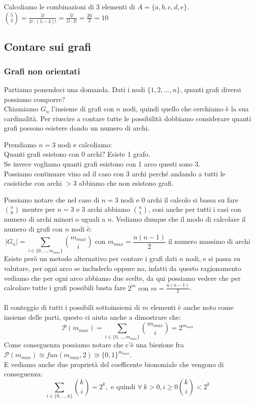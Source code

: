 \begin{example}
Calcoliamo le combinazioni di 3 elementi di $A = \{a,b,c,d,e\}$.\\
$\binom{5}{3} = \frac{5!}{ 3! \cdot (5 - 3)!} = \frac{5!}{5! \cdot 2!} = \frac{20}{2} = 10$
\end{example}

\subsection{Contare sui grafi}
\subsubsection{Grafi non orientati}
Partiamo ponendoci una domanda. Dati i nodi $\{1,2,...,n\}$, quanti grafi diversi possiamo comporre?\\
Chiamiamo $G_n$ l'insieme di grafi con $n$ nodi, quindi quello che cerchiamo è la sua cardinalità. Per riuscire a contare tutte le possibilità dobbiamo considerare quanti grafi possono esistere dando un numero di archi.
\begin{example}
Prendiamo $n=3$ nodi e calcoliamo:\\
Quanti grafi esistono con 0 archi? Esiste 1 grafo.\\
Se invece vogliamo quanti grafi esistono con 1 arco questi sono 3.\\
Possiamo continuare vino ad il caso con 3 archi perché andando a tutti le casistiche con archi $>3$ abbiamo che non esistono grafi.
\end{example}
\hspace{-15pt}Possiamo notare che nel caso di $n=3$ nodi e 0 archi il calcolo si bassa su fare $\binom{n}{0}$ mentre per $n=3$ e 3 archi abbiamo $\binom{n}{1}$, cosi anche per tutti i casi con numero di archi minori o uguali a $n$. Vediamo dunque che il modo di calcolare il numero di grafi con $n$ nodi è:
\[|G_n| = \sum_{i \in \{0,...,m_{max}\}}\binom{m_{max}}{i} \text{ con } m_{max} = \frac{n(n-1)}{2} \text{ il numero massimo di archi}\] 
Esiste però un metodo alternativo per contare i grafi dati $n$ nodi, e si passa su valutare, per ogni arco se includerlo oppure no, infatti da questo ragionamento vediamo che per ogni arco abbiamo due scelte, da qui possiamo vedere che per calcolare tutte i grafi possibili basta fare $2^m \text{ con } m = \frac{n(n-1)}{2}$.\\\\
Il conteggio di tutti i possibili sottoinsiemi di $m$ elementi è anche noto come insieme delle parti, questo ci aiuta anche a dimostrare che:
\[\mathcal{P}(m_{max}) = \sum_{i \in \{0,...,m_{max}\}}\binom{m_{max}}{i} = 2^{m_{max}}\]
Come conseguenza possiamo notare che c'è una biezione fra $\mathcal{P}(m_{max}) \cong fun(m_{max},2) \cong \{0,1\}^{m_{max}}$.\\
E vediamo anche due proprietà del coefficente bionomiale che vengono di conseguenza:
\[\sum_{i \in \{0,...,k\}}\binom{k}{i} = 2^{k}, \text{ e quindi } \forall \: k>0,i\geq 0 \binom{k}{i} < 2^k\]

